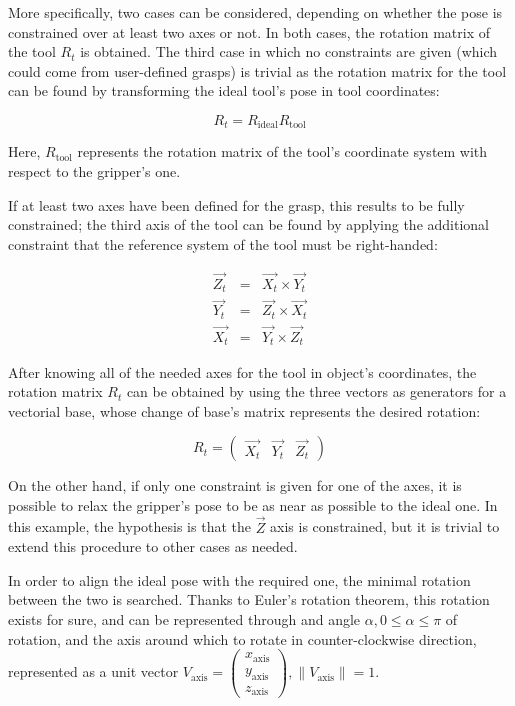 More specifically, two cases can be considered, depending on whether 
the pose is constrained over at least two axes or not. In both cases,
the rotation matrix of the tool $R_t$ is obtained. The third case in
which no constraints are given (which could come from user-defined
grasps) is trivial as the rotation matrix for the tool can be found by
transforming the ideal tool's pose in tool coordinates:

\begin{equation}\label{eqn:trivial-pose-constraining}
  R_t = R_{\text{ideal}} R_{\text{tool}}
\end{equation}

Here, $R_{\text{tool}}$ represents the rotation matrix of the tool's
coordinate system with respect to the gripper's one.

If at least two axes have been defined for the grasp, this results to
be fully constrained; the third axis of the tool can be
found by applying the additional constraint that the reference system
of the tool must be right-handed:

\begin{eqnarray}
  \vec{Z_t} &=& \vec{X_t} \times \vec{Y_t} \\
  \vec{Y_t} &=& \vec{Z_t} \times \vec{X_t} \\
  \vec{X_t} &=& \vec{Y_t} \times \vec{Z_t} 
\end{eqnarray}

After knowing all of the needed axes for the tool in object's
coordinates, the rotation matrix $R_t$ can be obtained by using the
three vectors as generators for a vectorial base, whose change of
base's matrix represents the desired rotation:

\begin{equation} 
  R_t = \left( \begin{array}{c|c|c} \vec{X_t} & \vec{Y_t} &
    \vec{Z_t} \end{array} \right)
\end{equation}

On the other hand, if only one constraint is given for one of the
axes, it is possible to relax the gripper's pose to be as near as
possible to the ideal one. In this example, the hypothesis is that the
$\vec{Z}$ axis is constrained, but it is trivial to extend this
procedure to other cases as needed.

In order to align the ideal pose with the required one, the minimal
rotation between the two is searched. Thanks to Euler's rotation
theorem, this rotation exists for sure, and can be represented
through and angle $\alpha, 0 \leq \alpha \leq \pi$ of rotation, and
the axis around which to rotate in counter-clockwise direction,
represented as a unit vector $V_{\text{axis}}
= \begin{pmatrix}x_{\text{axis}} \\ y_{\text{axis}} \\ z_{\text{axis}}
\end{pmatrix} , \lVert V_{\text{axis}} \rVert = 1$.

